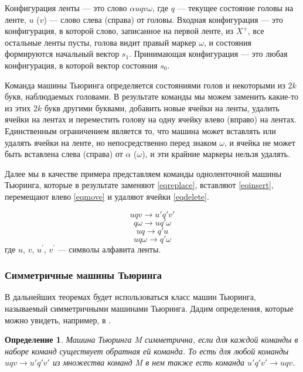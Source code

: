 \documentclass[14pt]{matmex-diploma-custom}
\newtheorem{defn}{Определение}[subsection]
\begin{document}
Конфигурация ленты --- это слово $ \alpha u q v \omega $, где $ q $ --- текущее состояние головы на ленте, 
$u$ ($ v $) --- слово слева (справа) от головы. 
Входная конфигурация --- это конфигурация, в которой слово, записанное на первой ленте, из
$X^+$, все остальные ленты пусты, голова видит правый маркер $\omega$, и состояния формируются
начальный вектор $s_1$. Принимающая конфигурация --- это любая конфигурация, в которой вектор состояния
$s_0$. 

Команда машины Тьюринга определяется состояниями голов и некоторыми из
$ 2k $ букв, наблюдаемых головами.
В результате команды мы можем заменить какие-то из этих $ 2k $ букв другими буквами,
добавить новые ячейки на ленты, удалить ячейки на лентах и переместить
голову на одну ячейку влево (вправо) на лентах.
Единственным ограничением является то, что машина может вставлять или удалять ячейки на ленте,
но непосредственно перед знаком $ \omega $, и ячейка не может быть вставлена слева (справа) от
$ \alpha $ ($ \omega $), и эти крайние маркеры нельзя удалять.

Далее мы в качестве примера представляем команды одноленточной машины Тьюринга, 
которые в результате заменяют \eqref{eqreplace},
вставляют \eqref{eqinsert}, перемещают влево \eqref{eqmove} и удаляют ячейки \eqref{eqdelete}.

\begin{equation}
    u q v \to u' q' v' \label{eqreplace}
\end{equation}
\begin{equation}
    q \omega \to u q' \omega \label{eqinsert}
\end{equation}
\begin{equation}
    u q \to q' u \label{eqmove}
\end{equation}
\begin{equation}
    u q \omega \to q' \omega \label{eqdelete}
\end{equation}
где $u$, $v$, $u^{'}$, $v^{'}$ --- символы алфавита ленты. 

\subsubsection{Симметричные машины Тьюринга}

В дальнейших теоремах будет использоваться класс машин Тьюринга,
называемый симметричными машинами Тьюринга. Дадим определения, которые можно увидеть, 
например, в \cite{symTM}.

\begin{defn}
Машина Тьюринга M симметрична, если для каждой команды в наборе команд существует
обратная ей команда. То есть для любой команды $ u q v \to u' q' v'$ из множества команд 
M в нем также есть команда $ u' q' v' \to u q v $.
\end{defn}
\end{document}
